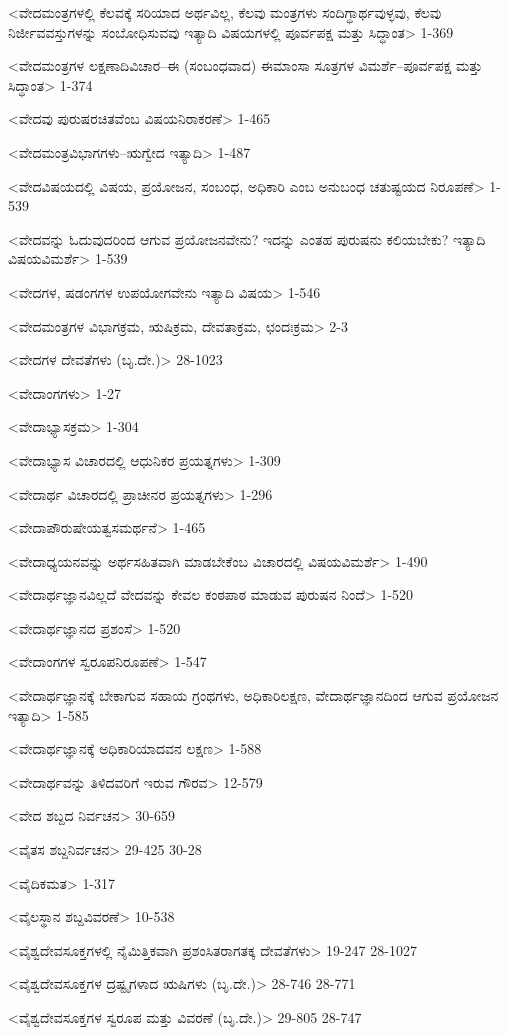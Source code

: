 <ವೇದಮಂತ್ರಗಳಲ್ಲಿ ಕೆಲವಕ್ಕೆ ಸರಿಯಾದ ಅರ್ಥವಿಲ್ಲ, ಕೆಲವು ಮಂತ್ರಗಳು ಸಂದಿಗ್ಧಾರ್ಥವುಳ್ಳವು, ಕೆಲವು ನಿರ್ಜೀವವಸ್ತುಗಳನ್ನು ಸಂಬೋಧಿಸುವವು ಇತ್ಯಾದಿ ವಿಷಯಗಳಲ್ಲಿ ಪೂರ್ವಪಕ್ಷ ಮತ್ತು ಸಿದ್ಧಾಂತ>
1-369

<ವೇದಮಂತ್ರಗಳ ಲಕ್ಷಣಾದಿವಿಚಾರ–ಈ (ಸಂಬಂಧವಾದ) ಈಮಾಂಸಾ ಸೂತ್ರಗಳ ವಿಮರ್ಶೆ–ಪೂರ್ವಪಕ್ಷ ಮತ್ತು ಸಿದ್ಧಾಂತ>
1-374

<ವೇದವು ಪುರುಷರಚಿತವೆಂಬ ವಿಷಯನಿರಾಕರಣೆ>
1-465

<ವೇದಮಂತ್ರವಿಭಾಗಗಳು–ಋಗ್ವೇದ ಇತ್ಯಾದಿ>
1-487

<ವೇದವಿಷಯದಲ್ಲಿ ವಿಷಯ, ಪ್ರಯೋಜನ, ಸಂಬಂಧ, ಅಧಿಕಾರಿ ಎಂಬ ಅನುಬಂಧ ಚತುಷ್ಟಯದ ನಿರೂಪಣೆ>
1-539

<ವೇದವನ್ನು ಓದುವುದರಿಂದ ಆಗುವ ಪ್ರಯೋಜನವೇನು? ಇದನ್ನು ಎಂತಹ ಪುರುಷನು ಕಲಿಯಬೇಕು? ಇತ್ಯಾದಿ ವಿಷಯವಿಮರ್ಶೆ>
1-539

<ವೇದಗಳ, ಷಡಂಗಗಳ ಉಪಯೋಗವೇನು ಇತ್ಯಾದಿ ವಿಷಯ>
1-546

<ವೇದಮಂತ್ರಗಳ ವಿಭಾಗಕ್ರಮ, ಋಷಿಕ್ರಮ, ದೇವತಾಕ್ರಮ, ಛಂದಃಕ್ರಮ>
2-3

<ವೇದಗಳ ದೇವತೆಗಳು (ಬೃ.ದೇ.)>
28-1023

<ವೇದಾಂಗಗಳು>
1-27

<ವೇದಾಭ್ಯಾಸಕ್ರಮ>
1-304

<ವೇದಾಭ್ಯಾಸ ವಿಚಾರದಲ್ಲಿ ಆಧುನಿಕರ ಪ್ರಯತ್ನಗಳು>
1-309

<ವೇದಾರ್ಥ ವಿಚಾರದಲ್ಲಿ ಪ್ರಾಚೀನರ ಪ್ರಯತ್ನಗಳು>
1-296

<ವೇದಾಪೌರುಷೇಯತ್ವಸಮರ್ಥನೆ>
1-465

<ವೇದಾಧ್ಯಯನವನ್ನು ಅರ್ಥಸಹಿತವಾಗಿ ಮಾಡಬೇಕೆಂಬ ವಿಚಾರದಲ್ಲಿ ವಿಷಯವಿಮರ್ಶೆ>
1-490

<ವೇದಾರ್ಥಜ್ಞಾನವಿಲ್ಲದೆ ವೇದವನ್ನು ಕೇವಲ ಕಂಠಪಾಠ ಮಾಡುವ ಪುರುಷನ ನಿಂದೆ>
1-520

<ವೇದಾರ್ಥಜ್ಞಾನದ ಪ್ರಶಂಸೆ>
1-520

<ವೇದಾಂಗಗಳ ಸ್ವರೂಪನಿರೂಪಣೆ>
1-547

<ವೇದಾರ್ಥಜ್ಞಾನಕ್ಕೆ ಬೇಕಾಗುವ ಸಹಾಯ ಗ್ರಂಥಗಳು, ಅಧಿಕಾರಿಲಕ್ಷಣ, ವೇದಾರ್ಥಜ್ಞಾನದಿಂದ ಆಗುವ ಪ್ರಯೋಜನ ಇತ್ಯಾದಿ>
1-585

<ವೇದಾರ್ಥಜ್ಞಾನಕ್ಕೆ ಅಧಿಕಾರಿಯಾದವನ ಲಕ್ಷಣ>
1-588

<ವೇದಾರ್ಥವನ್ನು ತಿಳಿದವರಿಗೆ ಇರುವ ಗೌರವ>
12-579

<ವೇದ ಶಬ್ದದ ನಿರ್ವಚನ>
30-659

<ವೈತಸ ಶಬ್ದನಿರ್ವಚನ>
29-425
30-28

<ವೈದಿಕಮತ>
1-317

<ವೈಲಸ್ಥಾನ ಶಬ್ದವಿವರಣೆ>
10-538

<ವೈಶ್ವದೇವಸೂಕ್ತಗಳಲ್ಲಿ ನೈಮಿತ್ತಿಕವಾಗಿ ಪ್ರಶಂಸಿತರಾಗತಕ್ಕ ದೇವತೆಗಳು>
19-247
28-1027

<ವೈಶ್ವದೇವಸೂಕ್ತಗಳ ದ್ರಷ್ಟೃಗಳಾದ ಋಷಿಗಳು (ಬೃ.ದೇ.)>
28-746
28-771

<ವೈಶ್ವದೇವಸೂಕ್ತಗಳ ಸ್ವರೂಪ ಮತ್ತು ವಿವರಣೆ (ಬೃ.ದೇ.)>
29-805
28-747


